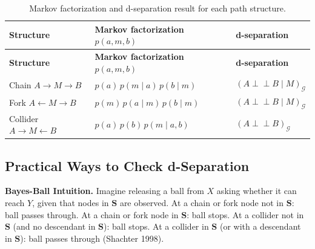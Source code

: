 \documentclass[
  a4paper,
]{book}
\newcommand{\indep}{\perp\!\!\!\perp}
\newcommand{\Gcal}{\mathcal{G}}
\begin{document}
\begin{longtable}[]{@{}
  >{\raggedright\arraybackslash}p{}
  >{\raggedright\arraybackslash}p{}
  >{\raggedright\arraybackslash}p{}@{}}
\caption{Markov factorization and d-separation result for each path
structure.}\label{tbl-markov-implications}\tabularnewline
\toprule\noalign{}
\begin{minipage}[b]{\linewidth}\raggedright
\textbf{Structure}
\end{minipage} & \begin{minipage}[b]{\linewidth}\raggedright
\textbf{Markov factorization} \(p(a,m,b)\)
\end{minipage} & \begin{minipage}[b]{\linewidth}\raggedright
\textbf{d-separation}
\end{minipage} \\
\midrule\noalign{}
\endfirsthead
\toprule\noalign{}
\begin{minipage}[b]{\linewidth}\raggedright
\textbf{Structure}
\end{minipage} & \begin{minipage}[b]{\linewidth}\raggedright
\textbf{Markov factorization} \(p(a,m,b)\)
\end{minipage} & \begin{minipage}[b]{\linewidth}\raggedright
\textbf{d-separation}
\end{minipage} \\
\midrule\noalign{}
\endhead
\bottomrule\noalign{}
\endlastfoot
Chain \(A\!\to\!M\!\to\!B\) & \(p(a)\,p(m\mid a)\,p(b\mid m)\) &
\((A\indep B\mid M)_{\Gcal}\) \\
Fork \(A\!\leftarrow\!M\!\to\!B\) & \(p(m)\,p(a\mid m)\,p(b\mid m)\) &
\((A\indep B\mid M)_{\Gcal}\) \\
Collider \(A\!\to\!M\!\leftarrow\!B\) & \(p(a)\,p(b)\,p(m\mid a,b)\) &
\((A\indep B)_{\Gcal}\) \\
\end{longtable}

\subsection{Practical Ways to Check
d-Separation}\label{practical-ways-to-check-d-separation}

\textbf{Bayes-Ball Intuition.} Imagine releasing a ball from \(X\)
asking whether it can reach \(Y\), given that nodes in \(\mathbf{S}\)
are observed. At a chain or fork node not in \(\mathbf{S}\): ball passes
through. At a chain or fork node in \(\mathbf{S}\): ball stops. At a
collider not in \(\mathbf{S}\) (and no descendant in \(\mathbf{S}\)):
ball stops. At a collider in \(\mathbf{S}\) (or with a descendant in
\(\mathbf{S}\)): ball passes through (Shachter 1998).
\end{document}

